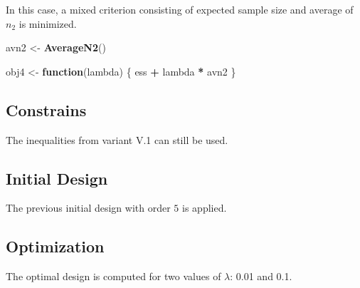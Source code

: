 \documentclass[]{book}
\newenvironment{Shaded}{\begin{snugshade}}{\end{snugshade}}
\newcommand{\ControlFlowTok}[1]{\textcolor[rgb]{0.13,0.29,0.53}{\textbf{#1}}}
\newcommand{\KeywordTok}[1]{\textcolor[rgb]{0.13,0.29,0.53}{\textbf{#1}}}
\newcommand{\NormalTok}[1]{#1}
\newcommand{\OperatorTok}[1]{\textcolor[rgb]{0.81,0.36,0.00}{\textbf{#1}}}
\newcommand{\StringTok}[1]{\textcolor[rgb]{0.31,0.60,0.02}{#1}}
\begin{document}
In this case, a mixed criterion consisting of expected sample size and
average of \(n_2\) is minimized.

\begin{Shaded}
\begin{Highlighting}[]
\NormalTok{avn2 <-}\StringTok{ }\KeywordTok{AverageN2}\NormalTok{()}

\NormalTok{obj4 <-}\StringTok{ }\ControlFlowTok{function}\NormalTok{(lambda) \{}
\NormalTok{    ess }\OperatorTok{+}\StringTok{ }\NormalTok{lambda }\OperatorTok{*}\StringTok{ }\NormalTok{avn2}
\NormalTok{\}}
\end{Highlighting}
\end{Shaded}

\hypertarget{constrains-13}{%
\subsection{Constrains}\label{constrains-13}}

The inequalities from variant V.1 can still be used.

\hypertarget{initial-design-12}{%
\subsection{Initial Design}\label{initial-design-12}}

The previous initial design with order \(5\) is applied.

\hypertarget{optimization-12}{%
\subsection{Optimization}\label{optimization-12}}

The optimal design is computed for two values of \(\lambda\): 0.01 and 0.1.
\end{document}
